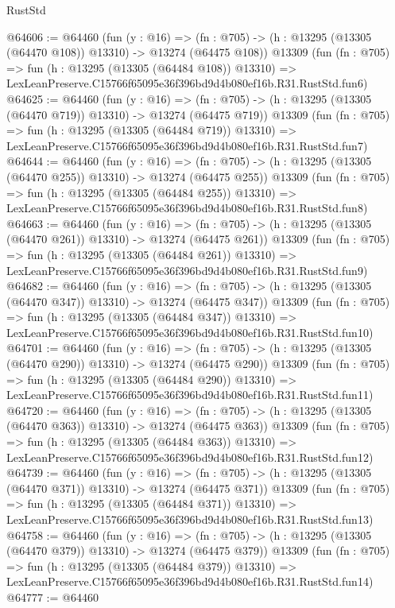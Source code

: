 \begin{lexlean}{RustStd}
\begin{coremodule}
@64606 := @64460
    (fun (y : @16) =>
    (fn : @705) -> (h : @13295 (@13305 (@64470 @108)) @13310) -> @13274 (@64475 @108))
    @13309
    (fun (fn : @705) =>
    fun (h : @13295 (@13305 (@64484 @108)) @13310) =>
    LexLeanPreserve.C15766f65095e36f396bd9d4b080ef16b.R31.RustStd.fun6)
@64625 := @64460
    (fun (y : @16) =>
    (fn : @705) -> (h : @13295 (@13305 (@64470 @719)) @13310) -> @13274 (@64475 @719))
    @13309
    (fun (fn : @705) =>
    fun (h : @13295 (@13305 (@64484 @719)) @13310) =>
    LexLeanPreserve.C15766f65095e36f396bd9d4b080ef16b.R31.RustStd.fun7)
@64644 := @64460
    (fun (y : @16) =>
    (fn : @705) -> (h : @13295 (@13305 (@64470 @255)) @13310) -> @13274 (@64475 @255))
    @13309
    (fun (fn : @705) =>
    fun (h : @13295 (@13305 (@64484 @255)) @13310) =>
    LexLeanPreserve.C15766f65095e36f396bd9d4b080ef16b.R31.RustStd.fun8)
@64663 := @64460
    (fun (y : @16) =>
    (fn : @705) -> (h : @13295 (@13305 (@64470 @261)) @13310) -> @13274 (@64475 @261))
    @13309
    (fun (fn : @705) =>
    fun (h : @13295 (@13305 (@64484 @261)) @13310) =>
    LexLeanPreserve.C15766f65095e36f396bd9d4b080ef16b.R31.RustStd.fun9)
@64682 := @64460
    (fun (y : @16) =>
    (fn : @705) -> (h : @13295 (@13305 (@64470 @347)) @13310) -> @13274 (@64475 @347))
    @13309
    (fun (fn : @705) =>
    fun (h : @13295 (@13305 (@64484 @347)) @13310) =>
    LexLeanPreserve.C15766f65095e36f396bd9d4b080ef16b.R31.RustStd.fun10)
@64701 := @64460
    (fun (y : @16) =>
    (fn : @705) -> (h : @13295 (@13305 (@64470 @290)) @13310) -> @13274 (@64475 @290))
    @13309
    (fun (fn : @705) =>
    fun (h : @13295 (@13305 (@64484 @290)) @13310) =>
    LexLeanPreserve.C15766f65095e36f396bd9d4b080ef16b.R31.RustStd.fun11)
@64720 := @64460
    (fun (y : @16) =>
    (fn : @705) -> (h : @13295 (@13305 (@64470 @363)) @13310) -> @13274 (@64475 @363))
    @13309
    (fun (fn : @705) =>
    fun (h : @13295 (@13305 (@64484 @363)) @13310) =>
    LexLeanPreserve.C15766f65095e36f396bd9d4b080ef16b.R31.RustStd.fun12)
@64739 := @64460
    (fun (y : @16) =>
    (fn : @705) -> (h : @13295 (@13305 (@64470 @371)) @13310) -> @13274 (@64475 @371))
    @13309
    (fun (fn : @705) =>
    fun (h : @13295 (@13305 (@64484 @371)) @13310) =>
    LexLeanPreserve.C15766f65095e36f396bd9d4b080ef16b.R31.RustStd.fun13)
@64758 := @64460
    (fun (y : @16) =>
    (fn : @705) -> (h : @13295 (@13305 (@64470 @379)) @13310) -> @13274 (@64475 @379))
    @13309
    (fun (fn : @705) =>
    fun (h : @13295 (@13305 (@64484 @379)) @13310) =>
    LexLeanPreserve.C15766f65095e36f396bd9d4b080ef16b.R31.RustStd.fun14)
@64777 := @64460

\end{coremodule}
\end{lexlean}
